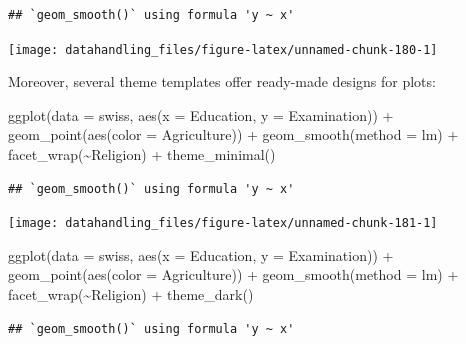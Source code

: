 \documentclass[
  12pt,
]{style/krantz}
\newenvironment{Shaded}{\begin{snugshade}}{\end{snugshade}}
\newcommand{\AttributeTok}[1]{\textcolor[rgb]{0.77,0.63,0.00}{#1}}
\newcommand{\FunctionTok}[1]{\textcolor[rgb]{0.00,0.00,0.00}{#1}}
\newcommand{\NormalTok}[1]{#1}
\newcommand{\SpecialCharTok}[1]{\textcolor[rgb]{0.00,0.00,0.00}{#1}}
\newcommand{\StringTok}[1]{\textcolor[rgb]{0.31,0.60,0.02}{#1}}
\begin{document}
\begin{verbatim}
## `geom_smooth()` using formula 'y ~ x'
\end{verbatim}

\texttt{[image: datahandling\_files/figure-latex/unnamed-chunk-180-1]}

Moreover, several theme templates offer ready-made designs for plots:

\begin{Shaded}
\begin{Highlighting}[]
\FunctionTok{ggplot}\NormalTok{(}\AttributeTok{data =}\NormalTok{ swiss, }\FunctionTok{aes}\NormalTok{(}\AttributeTok{x =}\NormalTok{ Education, }\AttributeTok{y =}\NormalTok{ Examination)) }\SpecialCharTok{+}
     \FunctionTok{geom\_point}\NormalTok{(}\FunctionTok{aes}\NormalTok{(}\AttributeTok{color =}\NormalTok{ Agriculture)) }\SpecialCharTok{+}
     \FunctionTok{geom\_smooth}\NormalTok{(}\AttributeTok{method =} \StringTok{\textquotesingle{}lm\textquotesingle{}}\NormalTok{) }\SpecialCharTok{+}
     \FunctionTok{facet\_wrap}\NormalTok{(}\SpecialCharTok{\textasciitilde{}}\NormalTok{Religion) }\SpecialCharTok{+}
     \FunctionTok{theme\_minimal}\NormalTok{()}
\end{Highlighting}
\end{Shaded}

\begin{verbatim}
## `geom_smooth()` using formula 'y ~ x'
\end{verbatim}

\texttt{[image: datahandling\_files/figure-latex/unnamed-chunk-181-1]}

\begin{Shaded}
\begin{Highlighting}[]
\FunctionTok{ggplot}\NormalTok{(}\AttributeTok{data =}\NormalTok{ swiss, }\FunctionTok{aes}\NormalTok{(}\AttributeTok{x =}\NormalTok{ Education, }\AttributeTok{y =}\NormalTok{ Examination)) }\SpecialCharTok{+}
     \FunctionTok{geom\_point}\NormalTok{(}\FunctionTok{aes}\NormalTok{(}\AttributeTok{color =}\NormalTok{ Agriculture)) }\SpecialCharTok{+}
     \FunctionTok{geom\_smooth}\NormalTok{(}\AttributeTok{method =} \StringTok{\textquotesingle{}lm\textquotesingle{}}\NormalTok{) }\SpecialCharTok{+}
     \FunctionTok{facet\_wrap}\NormalTok{(}\SpecialCharTok{\textasciitilde{}}\NormalTok{Religion) }\SpecialCharTok{+}
     \FunctionTok{theme\_dark}\NormalTok{()}
\end{Highlighting}
\end{Shaded}

\begin{verbatim}
## `geom_smooth()` using formula 'y ~ x'
\end{verbatim}
\end{document}
